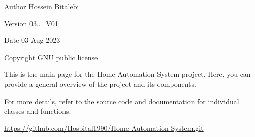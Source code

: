 \begin{DoxyAuthor}{Author}
Hossein Bitalebi 
\end{DoxyAuthor}
\begin{DoxyVersion}{Version}
03..\+\_\+\+V01 
\end{DoxyVersion}
\begin{DoxyDate}{Date}
03 Aug 2023 
\end{DoxyDate}
\begin{DoxyCopyright}{Copyright}
G\+NU public license
\end{DoxyCopyright}
This is the main page for the Home Automation System project. Here, you can provide a general overview of the project and its components.

For more details, refer to the source code and documentation for individual classes and functions.

\mbox{\hyperlink{}{https\+://github.\+com/\+Hosbital1990/\+Home-\/\+Automation-\/\+System.\+git}}